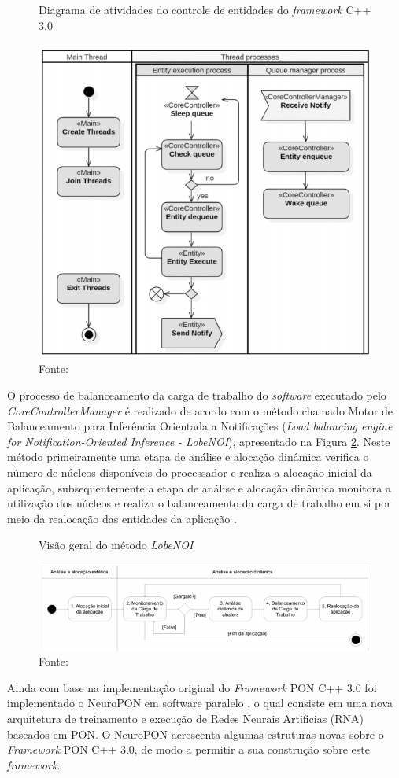 \begin{figure}[!htb]
  \centering
  \caption{Diagrama de atividades do controle de entidades do \textit{framework}
    C++ 3.0}
  \includegraphics[width=.55\textwidth]{../figures/fw30_flow.png}
  \caption*{Fonte: }
  \label{fig:fw3_flow}
\end{figure}

O processo de balanceamento da carga de trabalho do \textit{software} executado
pelo \textit{CoreControllerManager} é realizado de acordo com o método chamado
Motor de Balanceamento para Inferência Orientada a Notificações (\textit{Load
balancing engine for Notification-Oriented Inference - LobeNOI}), apresentado na
Figura \ref{fig:lobenoi}. Neste método primeiramente uma etapa de análise e
alocação dinâmica verifica o número de núcleos disponíveis do processador e
realiza a alocação inicial da aplicação, subsequentemente a etapa de análise e
alocação dinâmica monitora a utilização dos núcleos e realiza o balanceamento da
carga de trabalho em si por meio da realocação das entidades da aplicação
\cite{belmonte_2016}.

\begin{figure}[!htb]
  \centering
  \caption{Visão geral do método \textit{LobeNOI}} \includegraphics[width=\textwidth]{../figures/lobenoi.png}
  \caption*{Fonte:
  }
  \label{fig:lobenoi}
\end{figure}

Ainda com base na implementação original do \textit{Framework} PON C++ 3.0 foi
implementado o NeuroPON em software paralelo \cite{schutz_2018}, o qual consiste
em uma nova arquitetura de treinamento e execução de Redes Neurais Artificias
(RNA) baseados em PON. O NeuroPON acrescenta algumas estruturas novas sobre o
\textit{Framework} PON C++ 3.0, de modo a permitir a sua construção sobre este
\textit{framework}.

